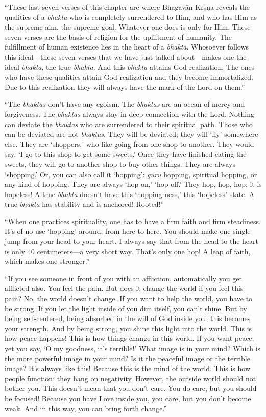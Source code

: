\enquote{These last seven verses of this chapter are where Bhagavān Kṛṣṇa reveals the qualities of a \textit{bhakta} who is completely surrendered to Him, and who has Him as the supreme aim, the supreme goal. Whatever one does is only for Him. These seven verses are the basis of religion for the upliftment of humanity. The fulfillment of human existence lies in the heart of a \textit{bhakta}. Whosoever follows this ideal---these seven verses that we have just talked about---makes one the ideal \textit{bhakta}, the true \textit{bhakta}. And this \textit{bhakta} attains God-realization. The ones who have these qualities attain God-realization and they become immortalized. Due to this realization they will always have the mark of the Lord on them.}

\enquote{The \textit{bhaktas} don’t have any egoism. The \textit{bhaktas} are an ocean of mercy and forgiveness. The \textit{bhaktas} always stay in deep connection with the Lord. Nothing can deviate the \textit{bhaktas} who are surrendered to their spiritual path. Those who can be deviated are not \textit{bhaktas}. They will be deviated; they will \enquote{fly} somewhere else. They are \enquote{shoppers,} who like going from one shop to another. They would say, \enquote{I go to this shop to get some sweets.} Once they have finished eating the sweets, they will go to another shop to buy other things. They are always \enquote{shopping.} Or, you can also call it \enquote{hopping}: \textit{guru} hopping, spiritual hopping, or any kind of hopping. They are always \enquote{hop on,} \enquote{hop off.} They hop, hop, hop; it is hopeless! A true \textit{bhakta} doesn’t have this \enquote{hopping-ness,} this \enquote{hopeless} state. A true \textit{bhakta} has stability and is anchored! Rooted!}

\enquote{When one practices spirituality, one has to have a firm faith and firm steadiness. It’s of no use \enquote{hopping} around, from here to here. You should make one single jump from your head to your heart. I always say that from the head to the heart is only 40 centimeters---a very short way. That’s only one hop! A leap of faith, which makes one stronger.}

\enquote{If you see someone in front of you with an affliction, automatically you get afflicted also. You feel the pain. But does it change the world if you feel this pain? No, the world doesn’t change. If you want to help the world, you have to be strong. If you let the light inside of you dim itself, you can’t shine. But by being self-centered, being absorbed in the will of God inside you, this becomes your strength. And by being strong, you shine this light into the world. This is how peace happens! This is how things change in this world. If you want peace, yet you say, \enquote{O my goodness, it’s terrible!} What image is in your mind? Which is the more powerful image in your mind? Is it the peaceful image or the terrible image? It’s always like this! Because this is the mind of the world. This is how people function: they hang on negativity. However, the outside world should not bother you. This doesn’t mean that you don’t care. You do care, but you should be focused! Because you have Love inside you, you care, but you don’t become weak. And in this way, you can bring forth change.}

